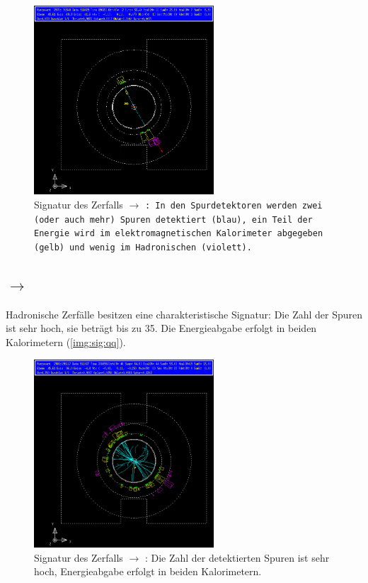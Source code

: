 \begin{figure}[H]
\begin{center}
  \includegraphics[width=0.6\textwidth]{../img/gropepics/tt1b.png}
  \caption{Signatur des Zerfalls \Z $\to$ \tt: In den Spurdetektoren werden zwei (oder auch mehr)
  Spuren detektiert (blau),
  ein Teil der Energie wird im elektromagnetischen Kalorimeter abgegeben (gelb) und wenig im Hadronischen (violett).}
  \label{img:sig:tt}
\end{center}
\end{figure} 

\subsection*{\Z $\to$ \qq}
Hadronische Zerfälle  besitzen eine charakteristische Signatur:
Die Zahl der Spuren ist sehr hoch, sie beträgt bis zu 35.
Die Energieabgabe erfolgt in beiden Kalorimetern (\autoref{img:sig:qq}).

\begin{figure}[H]
\begin{center}
  \includegraphics[width=0.6\textwidth]{../img/gropepics/qq1b.png}
  \caption{Signatur des Zerfalls \Z $\to$ \qq: Die Zahl der detektierten Spuren ist sehr hoch,
  Energieabgabe erfolgt in beiden Kalorimetern.}
  \label{img:sig:qq}
\end{center}
\end{figure} 
